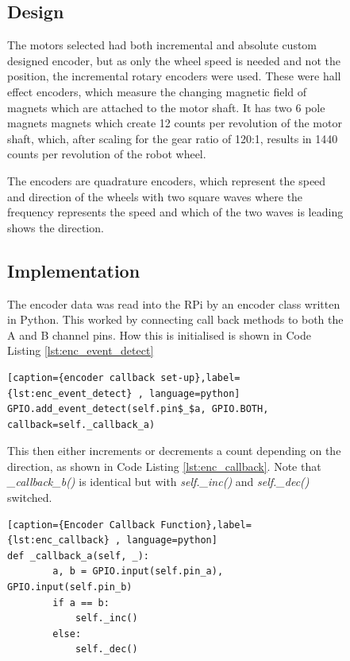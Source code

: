 \begin{figure}[!ht]
\subsection{Design}\label{elec/encoder/design}
 The motors selected had both incremental and absolute custom designed encoder, but as only the wheel speed is needed and not the position, the incremental rotary encoders were used. These were hall effect encoders, which measure the changing magnetic field of magnets which are attached to the motor shaft. It has two 6 pole magnets magnets which create 12 counts per revolution of the motor shaft, which, after scaling for the gear ratio of 120:1, results in 1440 counts per revolution of the robot wheel. 
 
The encoders are quadrature encoders, which represent the speed and direction of the wheels with two square waves where the frequency represents the speed and which of the two waves is leading shows the direction.

\subsection{Implementation}\label{elec/encoder/impl}

The encoder data was read into the RPi by an encoder class written in Python. This worked by connecting call back methods to both the A and B channel pins. How this is initialised is shown in Code Listing \ref{lst:enc_event_detect}


\begin{lstlisting}[caption={encoder callback set-up},label={lst:enc_event_detect} , language=python]
GPIO.add_event_detect(self.pin$_$a, GPIO.BOTH, callback=self._callback_a)
\end{lstlisting}

This then either increments or decrements a count depending on the direction, as shown in Code Listing \ref{lst:enc_callback}. Note that \textit{\_callback\_b()} is identical but with \textit{self.\_inc()} and \textit{self.\_dec()} switched.

\begin{lstlisting}[caption={Encoder Callback Function},label={lst:enc_callback} , language=python]
def _callback_a(self, _):
        a, b = GPIO.input(self.pin_a), GPIO.input(self.pin_b)
        if a == b:
            self._inc()
        else:
            self._dec()
\end{lstlisting}



\end{figure}
